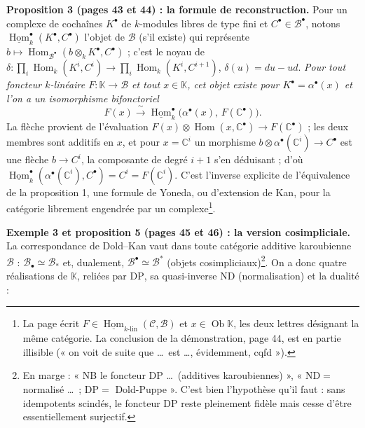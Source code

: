 \documentclass[11pt,a4paper]{article}
\begin{document}
\textbf{Proposition 3 (pages 43 et 44) : la formule de reconstruction.}
Pour un complexe de cochaînes $K^{\bullet}$ de $k$-modules libres de type
fini et $C^{\bullet} \in \mathcal{B}^{\bullet}$, notons
$\underline{\operatorname{Hom}}^{\bullet}_{k}(K^{\bullet}, C^{\bullet})$
l'objet de $\mathcal{B}$ (s'il existe) qui représente
$b \mapsto \operatorname{Hom}_{\mathcal{B}^{\bullet}}(b \otimes_{k}
K^{\bullet}, C^{\bullet})$ ; c'est le noyau de $\delta : \prod_{i}
\operatorname{Hom}_{k}(K^{i}, C^{i}) \to \prod_{i}
\operatorname{Hom}_{k}(K^{i}, C^{i+1})$, $\delta(u) = du - ud$. \emph{Pour
tout foncteur $k$-linéaire $F : \mathbb{K} \to \mathcal{B}$ et tout
$x \in \mathbb{K}$, cet objet existe pour $K^{\bullet} = \alpha^{\bullet}(x)$
et l'on a un isomorphisme bifonctoriel
\[
  F(x) \xrightarrow{\ \sim\ } \underline{\operatorname{Hom}}^{\bullet}_{k}
  \bigl(\alpha^{\bullet}(x),\, F(\mathbb{C}^{\bullet})\bigr).
\]}
La flèche provient de l'évaluation $F(x) \otimes \operatorname{Hom}(x,
\mathbb{C}^{\bullet}) \to F(\mathbb{C}^{\bullet})$ ; les deux membres sont
additifs en $x$, et pour $x = \mathbb{C}^{i}$ un morphisme
$b \otimes \alpha^{\bullet}(\mathbb{C}^{i}) \to C^{\bullet}$ est une flèche
$b \to C^{i}$, la composante de degré $i+1$ s'en déduisant ; d'où
$\underline{\operatorname{Hom}}^{\bullet}_{k}(\alpha^{\bullet}(\mathbb{C}^{i}),
C^{\bullet}) = C^{i} = F(\mathbb{C}^{i})$. C'est l'inverse explicite de
l'équivalence de la proposition 1, une formule de Yoneda, ou d'extension de
Kan, pour la catégorie librement engendrée par un complexe\footnote{La page
écrit $F \in \underline{\operatorname{Hom}}_{k\text{-lin}}(\mathcal{C},
\mathcal{B})$ et $x \in \operatorname{Ob} \mathbb{K}$, les deux lettres
désignant la même catégorie. La conclusion de la démonstration, page 44,
est en partie illisible (« on voit de suite que \ldots\ est \ldots,
évidemment, cqfd »).}.

\textbf{Exemple 3 et proposition 5 (pages 45 et 46) : la version
cosimpliciale.} La correspondance de Dold–Kan vaut dans toute catégorie
additive karoubienne $\mathcal{B}$ : $\mathcal{B}_{\bullet} \simeq
\mathcal{B}_{*}$ et, dualement, $\mathcal{B}^{\bullet} \simeq
\mathcal{B}^{*}$ (objets cosimpliciaux)\footnote{En marge : « NB le
foncteur DP \ldots\ (additives karoubiennes) », « $\mathrm{ND} =$ normalisé
\ldots\ ; $\mathrm{DP} =$ Dold-Puppe ». C'est bien l'hypothèse qu'il faut :
sans idempotents scindés, le foncteur $\mathrm{DP}$ reste pleinement fidèle
mais cesse d'être essentiellement surjectif.}. On a donc quatre réalisations
de $\mathbb{K}$, reliées par $\mathrm{DP}$, sa quasi-inverse
$\mathrm{ND}$ (normalisation) et la dualité :
\end{document}
